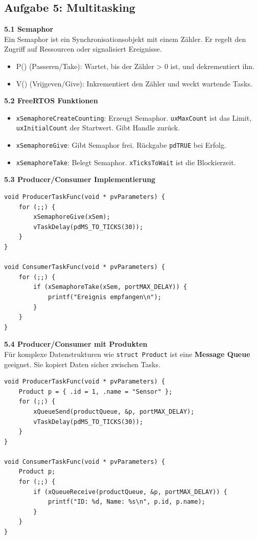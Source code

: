 \documentclass[12pt,a4paper]{article}
\begin{document}
\subsection{Aufgabe 5: Multitasking}

\textbf{5.1 Semaphor} \\
Ein Semaphor ist ein Synchronisationsobjekt mit einem Zähler. Er regelt den Zugriff auf Ressourcen oder signalisiert Ereignisse. 
\begin{itemize}
    \item P() (Passeren/Take): Wartet, bis der Zähler > 0 ist, und dekrementiert ihn.
    \item V() (Vrijgeven/Give): Inkrementiert den Zähler und weckt wartende Tasks.
\end{itemize}

\textbf{5.2 FreeRTOS Funktionen} \\
\begin{itemize}
    \item \texttt{xSemaphoreCreateCounting}: Erzeugt Semaphor. \texttt{uxMaxCount} ist das Limit, \texttt{uxInitialCount} der Startwert. Gibt Handle zurück.
    \item \texttt{xSemaphoreGive}: Gibt Semaphor frei. Rückgabe \texttt{pdTRUE} bei Erfolg.
    \item \texttt{xSemaphoreTake}: Belegt Semaphor. \texttt{xTicksToWait} ist die Blockierzeit.
\end{itemize}

\textbf{5.3 Producer/Consumer Implementierung}
\begin{lstlisting}
void ProducerTaskFunc(void * pvParameters) {
    for (;;) {
        xSemaphoreGive(xSem);
        vTaskDelay(pdMS_TO_TICKS(30));
    }
}

void ConsumerTaskFunc(void * pvParameters) {
    for (;;) {
        if (xSemaphoreTake(xSem, portMAX_DELAY)) {
            printf("Ereignis empfangen\n");
        }
    }
}
\end{lstlisting}

\newpage
\textbf{5.4 Producer/Consumer mit Produkten} \\
Für komplexe Datenstrukturen wie \texttt{struct Product} ist eine \textbf{Message Queue} geeignet. Sie kopiert Daten sicher zwischen Tasks.

\begin{lstlisting}
void ProducerTaskFunc(void * pvParameters) {
    Product p = { .id = 1, .name = "Sensor" };
    for (;;) {
        xQueueSend(productQueue, &p, portMAX_DELAY);
        vTaskDelay(pdMS_TO_TICKS(30));
    }
}

void ConsumerTaskFunc(void * pvParameters) {
    Product p;
    for (;;) {
        if (xQueueReceive(productQueue, &p, portMAX_DELAY)) {
            printf("ID: %d, Name: %s\n", p.id, p.name);
        }
    }
}
\end{lstlisting}
\end{document}
